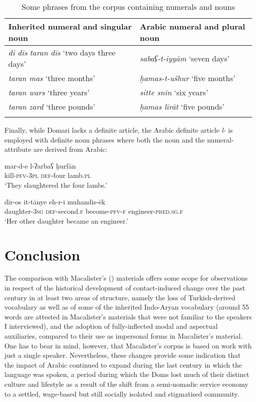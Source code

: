 \documentclass[output=paper]{langsci/langscibook}
\begin{document}
\begin{table}[]
\begin{tabularx}{\textwidth}{Ql}
\lsptoprule

Inherited numeral and singular noun & Arabic numeral and plural noun\\
\midrule
\textit{di dīs} \textit{taran dīs} ‘two days three days’ & \textit{sabaʕ-t-iyyām} ‘seven days’\\
\textit{taran mas} ‘three months’ & \textit{ḫamas-t-ušhur} ‘five months’\\
\textit{taran wars} ‘three years’ & \textit{sitte snīn} ‘six years’\\
\textit{taran zard} ‘three pounds’ & \textit{ḫamas līrāt} ‘five pounds’\\
 \lspbottomrule
\end{tabularx}
  \caption{Some phrases from the corpus containing numerals   and nouns}
  \label{inh}
  \end{table}

Finally, while Domari lacks a definite article, the Arabic definite article \textit{l-} is employed with definite noun phrases where both the noun and the numeral-attribute are derived from Arabic:

\ea
\gll mar-d-e l-ʔarbaʕ ḫurfān\\
         kill-\textsc{pfv-3pl} \textsc{def}-four lamb\textsc{.pl}\\
\glt     ‘They slaughtered the four lambs.’
\z

\ea\gll dīr-os it-tānye eh-r-i muhandis-ēk\\
         daughter-\textsc{3sg} \textsc{def}-second.\textsc{f} become-\textsc{pfv-f}        engineer-\textsc{pred.sg.f}\\
\glt     ‘Her other daughter became an engineer.’
\z

\section{Conclusion
}

The comparison with Macalister's (\citeyear{Macalister1914}) materials offers some scope for observations in respect of the historical development of contact-induced change over the past century in at least two areas of structure, namely the loss of Turkish-derived vocabulary as well as of some of the inherited Indo-Aryan vocabulary (around 55 words are attested in Macalister’s materials that were not familiar to the speakers I interviewed), and the adoption of fully-inflected modal and aspectual auxiliaries, compared to their use as impersonal forms in Macalister’s material. One has to bear in mind, however, that Macalister’s corpus is based on work with just a single speaker. Nevertheless, these changes provide some indication that the impact of Arabic continued to expand during the last century in which the language was spoken, a period during which the Doms lost much of their distinct culture and lifestyle as a result of the shift from a semi-nomadic service economy to a settled, wage-based but still socially isolated and stigmatised community. 
\end{document}
